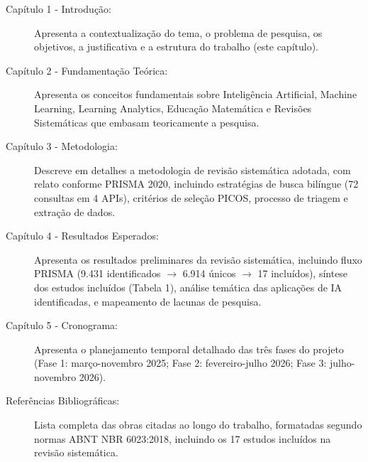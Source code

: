 \begin{description}
    \item[Capítulo 1 - Introdução:] Apresenta a contextualização do tema, o problema de pesquisa, os objetivos, a justificativa e a estrutura do trabalho (este capítulo).
    
    \item[Capítulo 2 - Fundamentação Teórica:] Apresenta os conceitos fundamentais sobre Inteligência Artificial, Machine Learning, Learning Analytics, Educação Matemática e Revisões Sistemáticas que embasam teoricamente a pesquisa.
    
    \item[Capítulo 3 - Metodologia:] Descreve em detalhes a metodologia de revisão sistemática adotada, com relato conforme PRISMA 2020, incluindo estratégias de busca bilíngue (72 consultas em 4 APIs), critérios de seleção PICOS, processo de triagem e extração de dados.
    
    \item[Capítulo 4 - Resultados Esperados:] Apresenta os resultados preliminares da revisão sistemática, incluindo fluxo PRISMA (9.431 identificados $\rightarrow$ 6.914 únicos $\rightarrow$ 17 incluídos), síntese dos estudos incluídos (Tabela 1), análise temática das aplicações de IA identificadas, e mapeamento de lacunas de pesquisa.
    
    \item[Capítulo 5 - Cronograma:] Apresenta o planejamento temporal detalhado das três fases do projeto (Fase 1: março-novembro 2025; Fase 2: fevereiro-julho 2026; Fase 3: julho-novembro 2026).
    
    \item[Referências Bibliográficas:] Lista completa das obras citadas ao longo do trabalho, formatadas segundo normas ABNT NBR 6023:2018, incluindo os 17 estudos incluídos na revisão sistemática.
\end{description}
% 
%